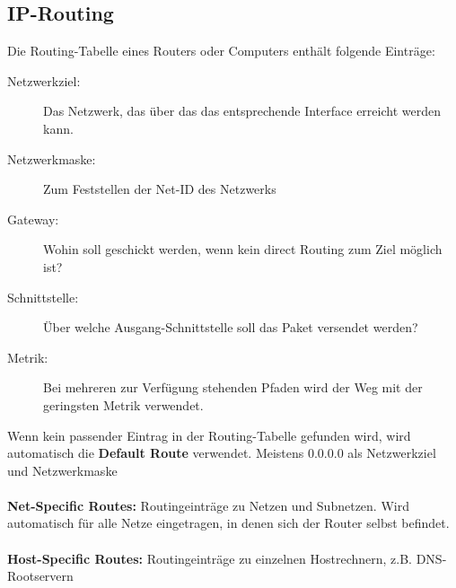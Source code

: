 \documentclass[a4paper,10pt]{scrartcl}
\begin{document}
    \subsection{IP-Routing}
        Die Routing-Tabelle eines Routers oder Computers enthält folgende Einträge:
        \begin{description}
        \item[Netzwerkziel:] Das Netzwerk, das über das das entsprechende Interface erreicht werden kann.
        \item[Netzwerkmaske:] Zum Feststellen der Net-ID des Netzwerks
        \item[Gateway:] Wohin soll geschickt werden, wenn kein direct Routing zum Ziel möglich ist?
        \item[Schnittstelle:] Über welche Ausgang-Schnittstelle soll das Paket versendet werden?
        \item[Metrik:] Bei mehreren zur Verfügung stehenden Pfaden wird der Weg mit der geringsten Metrik verwendet.
        \end{description}
        Wenn kein passender Eintrag in der Routing-Tabelle gefunden wird, wird automatisch die \textbf{Default Route} verwendet. Meistens 0.0.0.0 als Netzwerkziel und Netzwerkmaske\\ \\
        \textbf{Net-Specific Routes:} Routingeinträge zu Netzen und Subnetzen. Wird automatisch für alle Netze eingetragen, in denen sich der Router selbst befindet.\\ \\
        \textbf{Host-Specific Routes:} Routingeinträge zu einzelnen Hostrechnern, z.B. DNS-Rootservern
\end{document}
